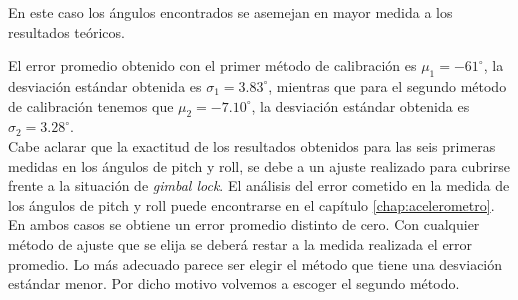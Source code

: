 \documentclass[main]{subfiles}
\begin{document}
En este caso los \'angulos encontrados se asemejan en mayor medida a los resultados te\'oricos.  



El error promedio obtenido con el primer m\'etodo de calibraci\'on es $\mu_1=-61^\circ$, la desviación estándar obtenida es $\sigma_1=3.83^\circ$, mientras que para el segundo método de calibración tenemos que $\mu_2=-7.10^\circ$, la desviación estándar obtenida es $\sigma_2=3.28^\circ$.\\

Cabe aclarar que la exactitud de los resultados obtenidos para las seis primeras medidas en los \'angulos de pitch y roll, se debe a un ajuste realizado para cubrirse frente a la situaci\'on de \emph{gimbal lock}. El an\'alisis del error cometido en la medida de los \'angulos de pitch y roll puede encontrarse en el cap\'itulo \ref{chap:acelerometro}.\\



En ambos casos se obtiene un error promedio distinto de cero. Con cualquier método de ajuste que se elija se deberá restar a la medida realizada el error promedio. Lo más adecuado parece ser elegir el método que tiene una desviación estándar menor. Por dicho motivo volvemos a escoger el segundo método. 
\end{document}
